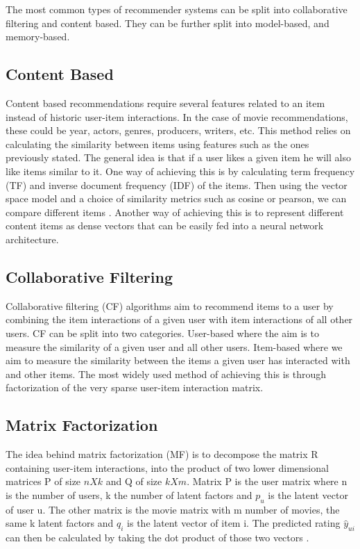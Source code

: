 The most common types of recommender systems can be split into collaborative filtering and content based. They can be further split into model-based, and memory-based.

\subsection{Content Based}
Content based recommendations require several features related to an item instead of historic user-item interactions. In the case of movie recommendations, these could be year, actors, genres, producers, writers, etc.
This method relies on calculating the similarity between items using features such as the ones previously stated.
The general idea is that if a user likes a given item he will also like items similar to it. One way of achieving this is by calculating term frequency (TF) and inverse document frequency (IDF) of the items. Then using the vector space model and a choice of similarity metrics such as cosine or pearson, we can compare different items \citet{MF_Techniques}.
Another way of achieving this is to represent different content items as dense vectors that can be easily fed into a neural network architecture.

\subsection{Collaborative Filtering}
Collaborative filtering (CF) algorithms aim to recommend items to a user by combining the item interactions of a given user with item interactions of all other users. CF can be split into two categories. User-based where the aim is to measure the similarity of a given user and all other users. Item-based where we aim to measure the similarity between the items a given user has interacted with and other items.
The most widely used method of achieving this is through factorization of the very sparse user-item interaction matrix.

\subsection{Matrix Factorization}
The idea behind matrix factorization (MF) is to decompose the matrix R containing user-item interactions, into the product of two lower dimensional matrices P of size \(n X k\) and Q of size \(k X m\). Matrix P is the user matrix where n is the number of users, k the number of latent factors and \(p_u\) is the latent vector of user u. The other matrix is the movie matrix with m number of movies, the same k latent factors and \(q_i\) is the latent vector of item i. The predicted rating \(\hat{y}_{ui}\) can then be calculated by taking the dot product of those two vectors \citet{MF_Techniques}.

